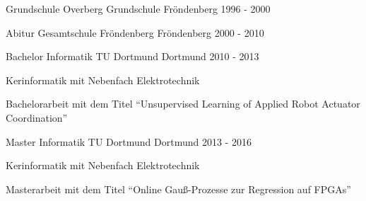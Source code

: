 

\begin{cventries}

  \cventry
    {Grundschule} %
    {Overberg Grundschule} %
    {Fröndenberg} %
    {1996 - 2000} %
    {
    }

    \cventry
    {Abitur} %
    {Gesamtschule Fröndenberg} %
    {Fröndenberg} %
    {2000 - 2010} %
    {
    }

    \cventry
    {Bachelor Informatik} %
    {TU Dortmund} %
    {Dortmund} %
    {2010 - 2013} %
    {
        \begin{cvitems} %
            \item Kerinformatik mit Nebenfach Elektrotechnik
            \item Bachelorarbeit mit dem Titel ``Unsupervised Learning of Applied Robot Actuator Coordination''
        \end{cvitems}
    }

    \cventry
    {Master Informatik} %
    {TU Dortmund} %
    {Dortmund} %
    {2013 - 2016} %
    {
        \begin{cvitems} %
            \item Kerinformatik mit Nebenfach Elektrotechnik
            \item Masterarbeit mit dem Titel ``Online Gau{\ss}-Prozesse zur Regression auf FPGAs''
        \end{cvitems}
    }

\end{cventries}
